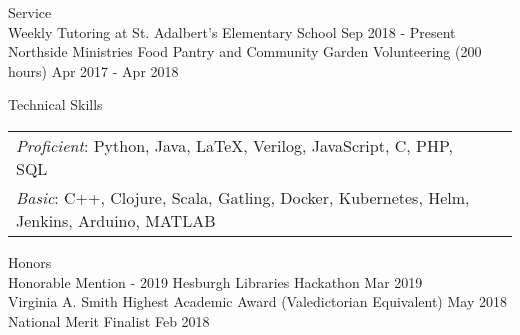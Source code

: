 \documentclass[10pt]{resume} %
\begin{document}
\begin{rSection}{Service}
\\ { Weekly Tutoring at St. Adalbert's Elementary School } \hfill { Sep 2018 - Present }
\\ { Northside Ministries Food Pantry and Community Garden Volunteering (200 hours) } \hfill { Apr 2017 - Apr 2018}
\end{rSection}


\begin{rSection}{Technical Skills}
\begin{tabular}{ @{} @{\hspace{1ex}} ll }
{\em Proficient}: Python, Java, LaTeX, Verilog, JavaScript, C, PHP, SQL \\ %
{\em Basic}: C++, Clojure, Scala, Gatling, Docker, Kubernetes, Helm, Jenkins, Arduino, MATLAB  \\

\end{tabular}

\end{rSection}

\begin{rSection}{Honors}
\\ { Honorable Mention - 2019 Hesburgh Libraries Hackathon } \hfill { Mar 2019 }
\\ { Virginia A. Smith Highest Academic Award (Valedictorian Equivalent) } \hfill { May 2018 }
\\ { National Merit Finalist } \hfill { Feb 2018 }
\end{rSection}
\end{document}
